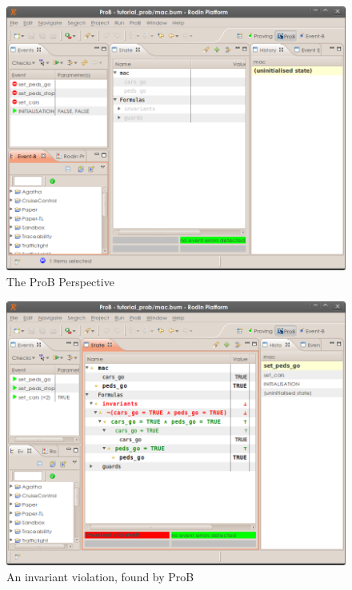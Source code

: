 \begin{figure}[!h]
\begin{center}
	\includegraphics[]{img/tutorial/tut_03_prob_perspective.png}
	\caption{The ProB Perspective}
	\label{fig_tut_prob_perspective}
\end{center}
\end{figure}

\begin{figure}[!h]
\begin{center}
	\includegraphics[]{img/tutorial/tut_03_prob_invariant_violation.png}
	\caption{An invariant violation, found by ProB}
	\label{tut_03_prob_invariant_violation}
\end{center}
\end{figure}


